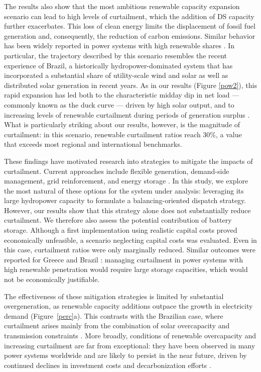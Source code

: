 \documentclass[a4paper,fleqn]{cas-dc}
\begin{document}
The results also show that the most ambitious renewable capacity expansion scenario can lead to high levels of curtailment, which the addition of DS capacity further exacerbates. This loss of clean energy limits the displacement of fossil fuel generation and, consequently, the reduction of carbon emissions. Similar behavior has been widely reported in power systems with high renewable shares \cite{li2015comprehensive, o2020too}. In particular, the trajectory described by this scenario resembles the recent experience of Brazil, a historically hydropower-dominated system that has incorporated a substantial share of utility-scale wind and solar as well as distributed solar generation in recent years. As in our results (Figure \ref{pow2}), this rapid expansion has led both to the characteristic midday dip in net load — commonly known as the duck curve — driven by high solar output, and to increasing levels of renewable curtailment during periods of generation surplus \cite{silva2026curtailment}. What is particularly striking about our results, however, is the magnitude of curtailment: in this scenario, renewable curtailment ratios reach 30\%, a value that exceeds most regional \cite{vonpapp2022vertimiento, soto2026wind} and international \cite{cui2020review, yasuda2023latest, vieira2026characterizing} benchmarks.

These findings have motivated research into strategies to mitigate the impacts of curtailment. Current approaches include flexible generation, demand-side management, grid reinforcement, and energy storage \cite{li2015comprehensive, bird2016wind, berrada2016valuation, denholm2019timescales}. In this study, we explore the most natural of these options for the system under analysis: leveraging its large hydropower capacity to formulate a balancing-oriented dispatch strategy. However, our results show that this strategy alone does not substantially reduce curtailment. We therefore also assess the potential contribution of battery storage. Although a first implementation using realistic capital costs proved economically unfeasible, a scenario neglecting capital costs was evaluated. Even in this case, curtailment ratios were only marginally reduced. Similar outcomes were reported for Greece \cite{psarros2025assessing} and Brazil \cite{da2025regulatory, vieira2025battery}: managing curtailment in power systems with high renewable penetration would require large storage capacities, which would not be economically justifiable. 

The effectiveness of these mitigation strategies is limited by substantial overgeneration, as renewable capacity additions outpace the growth in electricity demand (Figure~\ref{perc}a). This contrasts with the Brazilian case, where curtailment arises mainly from the combination of solar overcapacity and transmission constraints \cite{vieira2026characterizing}. More broadly, conditions of renewable overcapacity and increasing curtailment are far from exceptional: they have been observed in many power systems worldwide \cite{iea2020renewables} and are likely to persist in the near future, driven by continued declines in investment costs and decarbonization efforts \cite{feldman2021us}.
\end{document}
